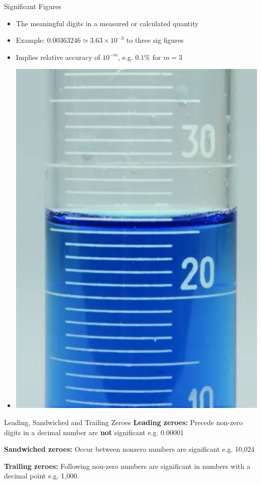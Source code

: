 \documentclass[11pt]{beamer}
\begin{document}
\begin{frame}{Significant Figures}
  \begin{itemize}
  \item The meaningful digits in a measured or calculated
    quantity
  \item Example: $0.00363246 \simeq 3.63 \times 10^{-3}$ to three
    sig figures
  \item Implies relative accuracy of $10^{-m}$, e.g. $0.1\%$ for $m=3$
  \item[] \begin{center}\includegraphics[scale=0.1]{grad}
  \end{center}
  \end{itemize}
\end{frame}

\begin{frame}{Leading, Sandwiched and Trailing Zeroes}
  \textbf{Leading zeroes:} Precede non-zero digits in a
  decimal number are \textbf{not} significant e.g. 0.00001

  \textbf{Sandwiched zeroes:} Occur between nonzero numbers are significant
  e.g. 10,024
  
  \textbf{Trailing zeroes:} Following non-zero numbers are
  significant in numbers with a decimal point e.g. 1,000.
\end{frame}
\end{document}
